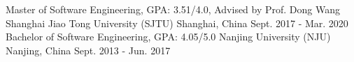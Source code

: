 \begin{cventries}
  \cventry
    {Master of Software Engineering, GPA: 3.51/4.0, Advised by Prof. Dong Wang} %
    {Shanghai Jiao Tong University (SJTU)} %
    {Shanghai, China} %
    {Sept. 2017 - Mar. 2020} %
    {} %
 \EntryGap
  \cventry
    {Bachelor of Software Engineering, GPA: 4.05/5.0} %
    {Nanjing University (NJU)} %
    {Nanjing, China} %
    {Sept. 2013 - Jun. 2017} %
    {}
\end{cventries}

